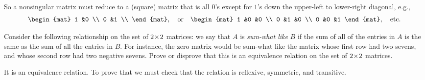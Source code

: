 \begin{exercises}
\begin{answer}
      So a nonsingular matrix must reduce to a (square) 
      matrix that is all \( 0 \)'s
      except for \( 1 \)'s down the upper-left to lower-right diagonal, e.g.,
      \begin{equation*}
         \begin{mat}
           1  &0  \\
           0  &1  \\
         \end{mat},
         \quad\text{or}\quad
         \begin{mat}
           1  &0  &0  \\
           0  &1  &0  \\
           0  &0  &1
         \end{mat},
         \quad\text{etc.}
      \end{equation*}  
    \end{answer}
 \item \cite{Cleary}
    Consider the following relationship on the set of $2 \! \times \! 2$ matrices:  
    we say that $A$ is \textit{sum-what like} $B$ if the sum of all of 
    the entries in $A$ is the same as the sum of all the entries in $B$.  
    For instance, the zero matrix would be sum-what like the matrix 
    whose first row had two sevens, and whose second row had two 
    negative sevens.
    Prove or disprove that this is an equivalence relation on the set 
    of $2 \! \times \! 2$ matrices.
    \begin{answer}
      It is an equivalence relation.
      To prove that we must check that the relation 
      is reflexive, symmetric, and transitive.


\end{answer}
\end{exercises}
